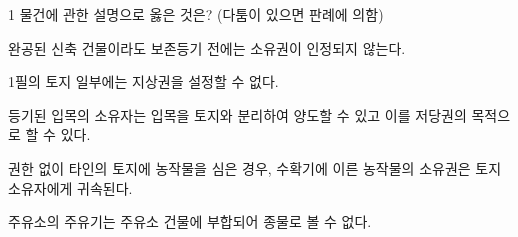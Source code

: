 \begin{question}{1}
물건에 관한 설명으로 옳은 것은? (다툼이 있으면 판례에 의함)
\begin{choices}
  \item 완공된 신축 건물이라도 보존등기 전에는 소유권이 인정되지 않는다.
  \item 1필의 토지 일부에는 지상권을 설정할 수 없다.
  \item 등기된 입목의 소유자는 입목을 토지와 분리하여 양도할 수 있고 이를 저당권의 목적으로 할 수 있다.
  \item 권한 없이 타인의 토지에 농작물을 심은 경우, 수확기에 이른 농작물의 소유권은 토지 소유자에게 귀속된다.
  \item 주유소의 주유기는 주유소 건물에 부합되어 종물로 볼 수 없다.
\end{choices}
\end{question}
